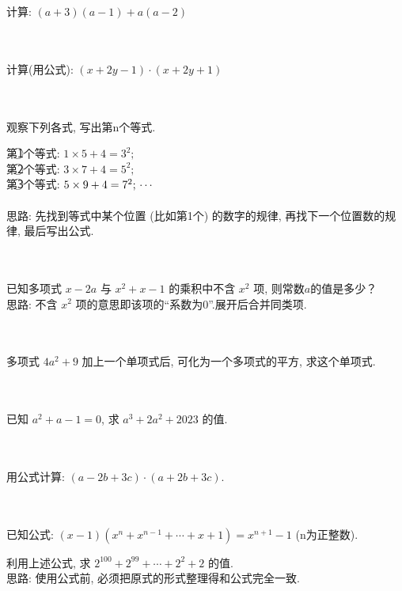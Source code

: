 \item{
    计算: $(a+3)(a-1) + a(a-2)$
}
\\ \\ \\

\item{
    计算(用公式): $(x+2y-1)\cdot (x+2y+1)$
}
\\ \\ \\

\item{
    观察下列各式, 写出第n个等式.

    第\textcircled{1}个等式: $1\times 5 + 4 = 3^2;$ \\
    第\textcircled{2}个等式: $3\times 7 + 4 = 5^2;$ \\
    第\textcircled{3}个等式: $5\times 9 + 4 = 7^2; \\ \cdots $ \\
    \ifshowSolution
    \fangsong{}
    \\
    思路: 先找到等式中某个位置 (比如第1个) 的数字的规律, 再找下一个位置数的规律, 最后写出公式.
    \fi
    \unless\ifshowSolution
    \\ \\ \\
    \fi
}

\item{
    已知多项式 $x-2a$ 与 $x^2+x-1$ 的乘积中不含 $x^2$ 项, 则常数$a$的值是多少？
    \ifshowSolution
    \fangsong{}
    \\
    思路: 不含 $x^2$ 项的意思即该项的“系数为0”.展开后合并同类项.
    \fi
    \unless\ifshowSolution
    \\ \\ \\
    \fi
}

\item{
    多项式 $4a^2+9$ 加上一个单项式后, 可化为一个多项式的平方, 求这个单项式.
}
\\ \\ \\

\item{
    已知 $a^2+a-1=0$, 求 $a^3 + 2a^2 + 2023$ 的值.
}
\\ \\ \\

\item{
    用公式计算: $(a-2b+3c)\cdot (a+2b+3c)$.
}
\\ \\ \\

\item{
    已知公式: $(x-1)(x^n + x^{n-1} + \cdots + x + 1) = x^{n+1} - 1$ (n为正整数).
    
    利用上述公式, 求 $2^{100} + 2^{99} +\cdots + 2^2 + 2$ 的值.
    \ifshowSolution
    \fangsong{}
    \\
    思路: 使用公式前, 必须把原式的形式整理得和公式完全一致.
    \fi
    \unless\ifshowSolution
    \\ \\ \\
    \fi
}